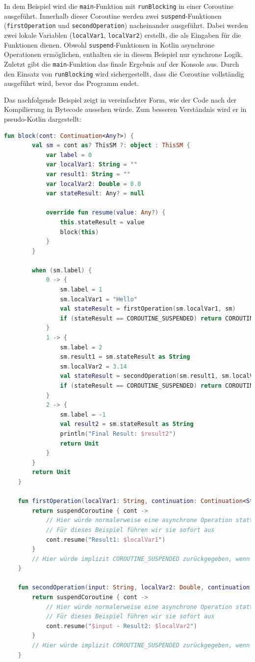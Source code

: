 \documentclass[fontsize=12pt,paper=a4,twoside=semi,parskip=half-,headsepline,headinclude]{scrreprt}
\begin{document}
In dem Beispiel wird die \texttt{main}-Funktion mit \texttt{runBlocking} in einer Coroutine ausgeführt. Innerhalb dieser Coroutine werden zwei \texttt{suspend}-Funktionen (\texttt{firstOperation} und \texttt{secondOperation}) nacheinander ausgeführt. Dabei werden zwei lokale Variablen (\texttt{localVar1}, \texttt{localVar2}) erstellt, die als Eingaben für die Funktionen dienen. Obwohl \texttt{suspend}-Funktionen in Kotlin asynchrone Operationen ermöglichen, enthalten sie in diesem Beispiel nur synchrone Logik. Zuletzt gibt die \texttt{main}-Funktion das finale Ergebnis auf der Konsole aus. Durch den Einsatz von \texttt{runBlocking} wird sichergestellt, dass die Coroutine vollständig ausgeführt wird, bevor das Programm endet.

Das nachfolgende Beispiel zeigt in vereinfachter Form, wie der Code nach der Kompilierung in Bytecode aussehen würde. Zum besseren Verständnis wird er in pseudo-Kotlin dargestellt:

\begin{lstlisting}[language=Kotlin]
	fun block(cont: Continuation<Any?>) {
		val sm = cont as? ThisSM ?: object : ThisSM {
			var label = 0
			var localVar1: String = ""
			var result1: String = ""
			var localVar2: Double = 0.0
			var stateResult: Any? = null
		
			override fun resume(value: Any?) {
				this.stateResult = value
				block(this)
			}
		}
	
		when (sm.label) {
			0 -> {
				sm.label = 1
				sm.localVar1 = "Hello"
				val stateResult = firstOperation(sm.localVar1, sm)
				if (stateResult == COROUTINE_SUSPENDED) return COROUTINE_SUSPENDED
			}
			1 -> {
				sm.label = 2
				sm.result1 = sm.stateResult as String
				sm.localVar2 = 3.14
				val stateResult = secondOperation(sm.result1, sm.localVar2, sm)
				if (stateResult == COROUTINE_SUSPENDED) return COROUTINE_SUSPENDED
			}
			2 -> {
				sm.label = -1
				val result2 = sm.stateResult as String
				println("Final Result: $result2")
				return Unit
			}
		}
		return Unit
	}

	fun firstOperation(localVar1: String, continuation: Continuation<String>): Any? {
		return suspendCoroutine { cont ->
			// Hier würde normalerweise eine asynchrone Operation stattfinden
			// Für dieses Beispiel führen wir sie sofort aus
			cont.resume("Result1: $localVar1")
		}
		// Hier würde implizit COROUTINE_SUSPENDED zurückgegeben, wenn die Coroutine blockieren würde
	}

	fun secondOperation(input: String, localVar2: Double, continuation: Continuation<String>): Any? {
		return suspendCoroutine { cont ->
			// Hier würde normalerweise eine asynchrone Operation stattfinden
			// Für dieses Beispiel führen wir sie sofort aus
			cont.resume("$input - Result2: $localVar2")
		}
		// Hier würde implizit COROUTINE_SUSPENDED zurückgegeben, wenn die Coroutine blockieren würde
	}
\end{lstlisting}
\end{document}
